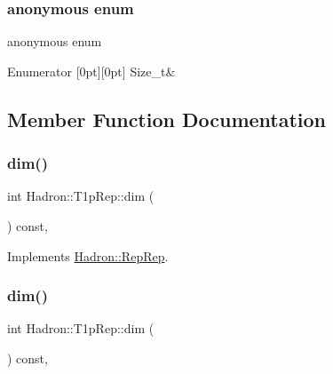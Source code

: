 \subsubsection{\texorpdfstring{anonymous enum}{anonymous enum}}
{\footnotesize\ttfamily anonymous enum}

\begin{DoxyEnumFields}{Enumerator}
[0pt][0pt]{}\mbox{\label{structHadron_1_1T1pRep_a28c00a8dc4af4de05135a097a2ad6be7ace463da5e26ea39d45d01b927116be67}} 
Size\+\_\+t&\\
\hline

\end{DoxyEnumFields}


\subsection{Member Function Documentation}
\mbox{\label{structHadron_1_1T1pRep_a8701f4d6be60663f10c103c8c53a191a}} 
\subsubsection{\texorpdfstring{dim()}{dim()}\hspace{0.1cm}{\footnotesize\ttfamily [1/5]}}
{\footnotesize\ttfamily int Hadron\+::\+T1p\+Rep\+::dim (\begin{DoxyParamCaption}{ }\end{DoxyParamCaption}) const\hspace{0.3cm}{\ttfamily [inline]}, {\ttfamily [virtual]}}



Implements \mbox{\hyperlink{structHadron_1_1RepRep_a92c8802e5ed7afd7da43ccfd5b7cd92b}{Hadron\+::\+Rep\+Rep}}.

\mbox{\label{structHadron_1_1T1pRep_a8701f4d6be60663f10c103c8c53a191a}} 
\subsubsection{\texorpdfstring{dim()}{dim()}\hspace{0.1cm}{\footnotesize\ttfamily [2/5]}}
{\footnotesize\ttfamily int Hadron\+::\+T1p\+Rep\+::dim (\begin{DoxyParamCaption}{ }\end{DoxyParamCaption}) const\hspace{0.3cm}{\ttfamily [inline]}, {\ttfamily [virtual]}}



